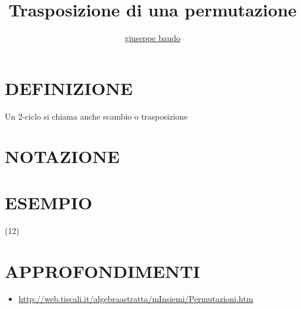 \documentclass[a4paper,10pt]{article}
\title{Trasposizione di una permutazione}
\author{\href{http://www.baudo.hol.es}{giuseppe baudo}}
\begin{document}
\maketitle

\section{DEFINIZIONE}
Un 2-ciclo si chiama anche scambio o trasposizione

\section{NOTAZIONE}

\section{ESEMPIO}
(12)

\section{APPROFONDIMENTI}
\begin{itemize}
 \item \url{http://web.tiscali.it/algebraastratta/mInsiemi/Permutazioni.htm}
\end{itemize}
\end{document}

